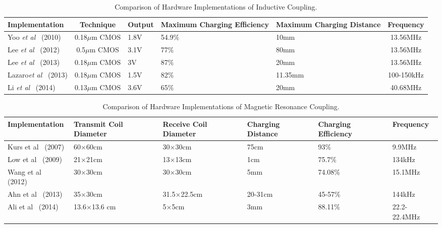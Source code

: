 \documentclass[twocolumn,10pt]{IEEEtran}
\begin{document}
\begin{table*} \small
\centering
\caption{\footnotesize Comparison of Hardware Implementations of Inductive Coupling.} \label{Hardware_comparison} 
\begin{tabular}{|l|c|p{2.6cm}|p{2.9cm}|p{2.9cm}|c| } 
\hline
\footnotesize Implementation &  Technique & Output &  Maximum Charging Efficiency  &  Maximum Charging Distance & Frequency \\   
\hline
Yoo {\em et al}~\cite{J.2010Yoo} (2010) &   0.18$\mu$m CMOS & 1.8V & 54.9$\%$ & 10mm & 13.56MHz  \\
\hline
Lee {\em et al}~\cite{M.2012Lee} (2012) &   0.5$\mu$m CMOS &  3.1V & 77$\%$ & 80mm & 13.56MHz    \\
\hline
Lee {\em et al}~\cite{Y.2013Lee} (2013) &   0.18$\mu$m CMOS & 3V & 87$\%$ & 20mm & 13.56MHz    \\
\hline
Lazaro{\em et al}~\cite{O.2013Lazaro} (2013) &  0.18$\mu$m CMOS & 1.5V & 82$\%$ & 11.35mm & 100-150kHz   \\
\hline 
Li {\em et al}~\cite{X.2015Li} (2014) &   0.13$\mu$m CMOS & 3.6V & 65$\%$ &    20mm & 40.68MHz  \\
\hline
\end{tabular}
\end{table*} 

\begin{table*} \small
\centering
\caption{\footnotesize Comparison of Hardware Implementations of Magnetic Resonance Coupling.} \label{Hardware_RC}
\begin{tabular}{|l|p{2.1cm}|p{2.1cm}|l|l|l| } 
\hline
\footnotesize Implementation &  Transmit Coil Diameter & Receive Coil Diameter & Charging Distance  &  Charging Efficiency & Frequency \\
\hline
Kurs {et al}~\cite{Kurs2007A} (2007) & 60$\times$60cm  & 30$\times$30cm & 75cm & 93$\%$ & 9.9MHz\\
\hline
Low {et al}~\cite{N.2009Low} (2009) & 21$\times$21cm  & 13$\times$13cm & 1cm & 75.7$\%$ & 134kHz\\
\hline
Wang {et al}~\cite{D.2012Wang} (2012) &  30$\times$30cm  & 30$\times$30cm &  5mm & 74.08$\%$  & 15.1MHz \\
\hline
Ahn {et al}~\cite{D.2013Ahn} (2013) & 35$\times$30cm & 31.5$\times$22.5cm & 20-31cm & 45-57$\%$  & 144kHz\\
\hline
Ali {et al}~\cite{T.2014Ali} (2014) & 13.6$\times$13.6 cm & 5$\times$5cm & 3mm & 88.11$\%$ & 22.2-22.4MHz \\
\hline
\end{tabular}
\end{table*} 
\end{document}
